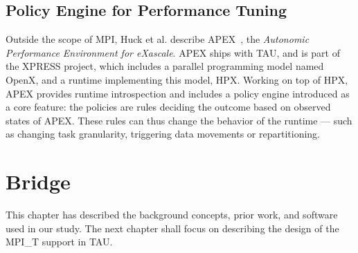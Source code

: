 \subsection{Policy Engine for Performance Tuning}

Outside the scope of MPI, Huck et al. describe APEX~\cite{Huck:2013:EPA:2491661.2481434}, the \textit{Autonomic Performance Environment for eXascale}.
APEX ships with TAU, and is part of the XPRESS project, which includes a parallel programming model named OpenX, and a runtime implementing this model, HPX.
Working on top of HPX, APEX provides runtime introspection and includes a policy engine introduced as a core feature: the policies are rules deciding the outcome based on observed states of APEX.
These rules can thus change the behavior of the runtime --- such as changing task granularity, triggering data movements or repartitioning.

\section{Bridge}
This chapter has described the background concepts, prior work, and software used in our study. The next chapter shall focus on describing the design of the MPI\_T support in TAU.
